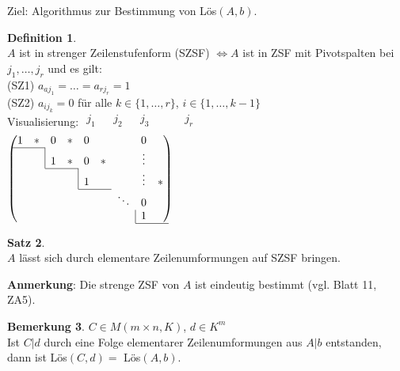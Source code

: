 \documentclass[10pt,a4paper,numbers=endperiod]{scrartcl}
\theoremstyle{definition}
\newtheorem{satz}{Satz}[section]
\newtheorem{defi}[satz]{Definition}
\newtheorem{bem}[satz]{Bemerkung}
\begin{document}
Ziel: Algorithmus zur Bestimmung von Lös$(A,b)$.

\begin{defi}
	$ $ \\
	$A$ ist in strenger Zeilenstufenform (SZSF) $\Leftrightarrow A$ ist in ZSF mit Pivotspalten bei $j_1,\ldots,j_r$ und es gilt:\\
	(SZ1) $a_{aj_1} = \ldots = a_{rj_r} = 1$\\
	(SZ2) $a_{ij_k} = 0$ für alle $k \in \{1,\ldots,r\}$, $i \in \{1,\ldots,k-1\}$\\
	Visualisierung: $\begin{array}{ccccccccc}
		j_1&&j_2&&j_3&&&&j_r\\
	\end{array}$\\
	\hspace*{21,5mm}$\begin{pmatrix}
		1&*&0&*&0&&&0&\\
		\cline{1-2}
		&&\multicolumn{1}{|c}{1}&*&0&*&&\vdots&\\
		\cline{3-4}
		&&&&\multicolumn{1}{|c}{1}&&&\vdots&*\\
		\cline{5-6} 
		&&&&&&\ddots&0&\\
		&&&&&&&\multicolumn{1}{|c}{1}&\\
		\cline{8-9}
	\end{pmatrix}$
\end{defi}

\begin{satz}
	$ $\\
	$A$ lässt sich durch elementare Zeilenumformungen auf SZSF bringen.
\end{satz}

\textbf{Anmerkung}: Die strenge ZSF von $A$ ist eindeutig bestimmt (vgl. Blatt 11, ZA5).\\

\begin{bem}
	$C \in M(m\times n, K)$, $d \in K^m$\\
	Ist $C|d$ durch eine Folge elementarer Zeilenumformungen aus $A|b$ entstanden, dann ist Lös$(C,d) =$ Lös$(A,b)$.
\end{bem}
\end{document}
